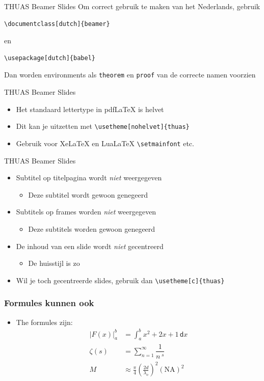 \documentclass[fleqn,aspectratio=169,dutch]{beamer}
\begin{document}
\begin{frame}[fragile]{THUAS Beamer Slides}
Om correct gebruik te maken van het Nederlands, gebruik
\begin{lstlisting}
\documentclass[dutch]{beamer}
\end{lstlisting}
en
\begin{lstlisting}
\usepackage[dutch]{babel}
\end{lstlisting}
Dan worden environments als \lstinline|theorem| en \lstinline|proof| van de correcte namen voorzien
\end{frame}

\begin{frame}[fragile]{THUAS Beamer Slides}
\begin{itemize}
\item Het standaard lettertype in pdf\LaTeX{} is helvet
\item Dit kan je uitzetten met \lstinline|\usetheme[nohelvet]{thuas}|
\item Gebruik voor Xe\LaTeX{} en Lua\LaTeX{} \lstinline|\setmainfont| etc.
\end{itemize}
\end{frame}

\begin{frame}[fragile]{THUAS Beamer Slides}
\begin{itemize}
\item Subtitel op titelpagina wordt \emph{niet} weergegeven
\begin{itemize}
\item Deze subtitel wordt gewoon genegeerd
\end{itemize}
\item Subtitels op frames worden \emph{niet} weergegeven
\begin{itemize}
\item Deze subtitels worden gewoon genegeerd
\end{itemize}
\item De inhoud van een slide wordt \emph{niet} gecentreerd
\begin{itemize}
\item De huisstijl is zo
\end{itemize}
\item Wil je toch gecentreerde slides, gebruik dan \lstinline|\usetheme[c]{thuas}|
\end{itemize}
\end{frame}

\begin{frame}
\frametitle{Formules kunnen ook}
\begin{itemize}
\item The formules zijn:
\begin{align*}
\left|F(x)\right|^b_a &= \int_a^b x^2 + 2x + 1 \, \mathsf{d} x \\
\zeta (s) &= \sum_{n=1}^\infty \dfrac{1}{n^{\;\!s}} \\
M&\approx\frac{\pi}{4}\left(\frac{2d}{\lambda_o}\right)^2\left(\mathrm{NA}\right)^2
\end{align*}
\end{itemize}
\end{frame}
\end{document}
